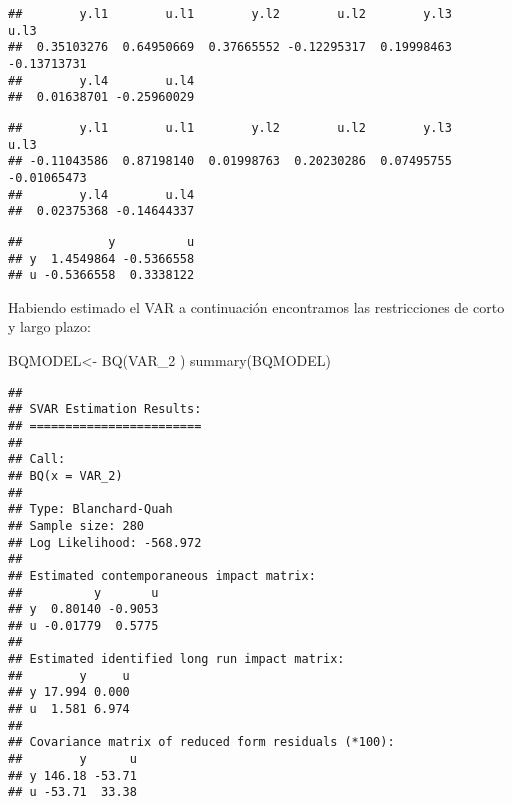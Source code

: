 \documentclass[
]{book}
\newenvironment{Shaded}{\begin{snugshade}}{\end{snugshade}}
\newcommand{\FunctionTok}[1]{\textcolor[rgb]{0.00,0.00,0.00}{#1}}
\newcommand{\NormalTok}[1]{#1}
\newcommand{\OtherTok}[1]{\textcolor[rgb]{0.56,0.35,0.01}{#1}}
\newcommand{\SpecialCharTok}[1]{\textcolor[rgb]{0.00,0.00,0.00}{#1}}
\begin{document}
\begin{verbatim}
##        y.l1        u.l1        y.l2        u.l2        y.l3        u.l3 
##  0.35103276  0.64950669  0.37665552 -0.12295317  0.19998463 -0.13713731 
##        y.l4        u.l4 
##  0.01638701 -0.25960029
\end{verbatim}

\begin{Shaded}
\end{Shaded}

\begin{verbatim}
##        y.l1        u.l1        y.l2        u.l2        y.l3        u.l3 
## -0.11043586  0.87198140  0.01998763  0.20230286  0.07495755 -0.01065473 
##        y.l4        u.l4 
##  0.02375368 -0.14644337
\end{verbatim}

\begin{Shaded}
\end{Shaded}

\begin{verbatim}
##            y          u
## y  1.4549864 -0.5366558
## u -0.5366558  0.3338122
\end{verbatim}

Habiendo estimado el VAR a continuación encontramos las restricciones de corto y largo plazo:

\begin{Shaded}
\begin{Highlighting}[]
\NormalTok{BQMODEL}\OtherTok{\textless{}{-}} \FunctionTok{BQ}\NormalTok{(VAR\_2 )}
\FunctionTok{summary}\NormalTok{(BQMODEL)}
\end{Highlighting}
\end{Shaded}

\begin{verbatim}
## 
## SVAR Estimation Results:
## ======================== 
## 
## Call:
## BQ(x = VAR_2)
## 
## Type: Blanchard-Quah 
## Sample size: 280 
## Log Likelihood: -568.972 
## 
## Estimated contemporaneous impact matrix:
##          y       u
## y  0.80140 -0.9053
## u -0.01779  0.5775
## 
## Estimated identified long run impact matrix:
##        y     u
## y 17.994 0.000
## u  1.581 6.974
## 
## Covariance matrix of reduced form residuals (*100):
##        y      u
## y 146.18 -53.71
## u -53.71  33.38
\end{verbatim}
\end{document}
